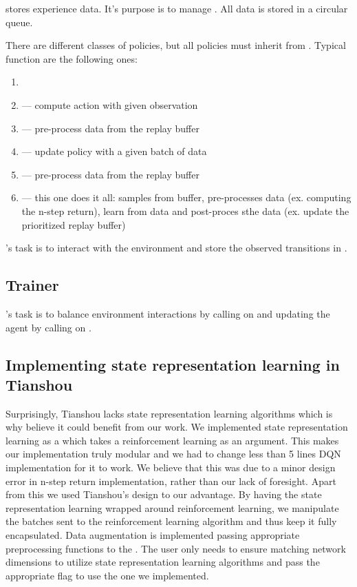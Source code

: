  stores experience data.
It's purpose is to manage .
All data is stored in a circular queue.


There are different classes of policies, but all policies must inherit from .
Typical function are the following ones:
\begin{enumerate}
		\item {}
		\item {} --- compute action with given observation
		\item {} --- pre-process data from the replay buffer
		\item {} --- update policy with a given batch of data
		\item {} --- pre-process data from the replay buffer
		\item {} --- this one does it all: samples from buffer,
				pre-processes data (ex. computing the n-step return),
				learn from data and post-proces sthe data (ex. update the prioritized replay buffer)
\end{enumerate}


's task is to interact with the environment
and store the observed transitions in .
\subsection{Trainer}'s task is to balance environment interactions by calling on 
and updating the agent by calling on .


\subsection{Implementing state representation learning in Tianshou}
Surprisingly, Tianshou lacks state representation learning algorithms
which is why believe it could benefit from our work.
We implemented state representation learning as a 
which takes a reinforcement learning  as an argument.
This makes our implementation truly modular and we had to change less than 5 lines 
DQN implementation for it to work. We believe that this was due to a minor design
error in n-step return implementation, rather than our lack of foresight.
Apart from this we used Tianshou's design to our advantage.
By having the state representation learning wrapped around reinforcement learning,
we manipulate the batches sent to the reinforcement learning algorithm
and thus keep it fully encapsulated.
Data augmentation is implemented passing appropriate 
preprocessing functions to the .
The user only needs to ensure matching network dimensions to utilize 
state representation learning algorithms and pass the appropriate flag
to use the one we implemented.

